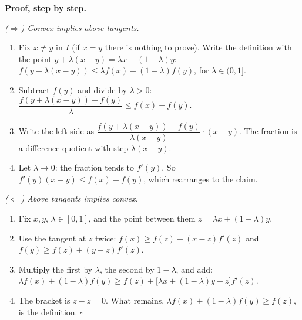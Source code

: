 \begin{center}
\end{center}

\textbf{Proof, step by step.}

\emph{($\Rightarrow$) Convex implies above tangents.}
\begin{enumerate}
  \item Fix $x\ne y$ in $I$ (if $x=y$ there is nothing to prove). Write the definition with the point $y+\lambda(x-y) = \lambda x+(1-\lambda)y$:
        $f(y+\lambda(x-y))\le\lambda f(x)+(1-\lambda)f(y)$, for $\lambda\in(0,1]$.
  \item Subtract $f(y)$ and divide by $\lambda>0$: $\dfrac{f(y+\lambda(x-y))-f(y)}{\lambda}\le f(x)-f(y)$.
  \item Write the left side as $\dfrac{f(y+\lambda(x-y))-f(y)}{\lambda(x-y)}\cdot(x-y)$. The fraction is a difference quotient with step $\lambda(x-y)$.
  \item Let $\lambda\to0$: the fraction tends to $f'(y)$. So $f'(y)(x-y)\le f(x)-f(y)$, which rearranges to the claim.
\end{enumerate}

\emph{($\Leftarrow$) Above tangents implies convex.}
\begin{enumerate}
  \item Fix $x,y$, $\lambda\in[0,1]$, and the point between them $z=\lambda x+(1-\lambda)y$.
  \item Use the tangent at $z$ twice: $f(x)\ge f(z)+(x-z)f'(z)$ and $f(y)\ge f(z)+(y-z)f'(z)$.
  \item Multiply the first by $\lambda$, the second by $1-\lambda$, and add:
        $\lambda f(x)+(1-\lambda)f(y)\ge f(z) + \big[\lambda x+(1-\lambda)y - z\big]f'(z)$.
  \item The bracket is $z-z=0$. What remains, $\lambda f(x)+(1-\lambda)f(y)\ge f(z)$, is the definition. $\square$
\end{enumerate}

